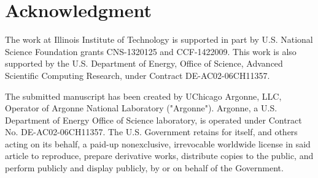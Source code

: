 \documentclass[conference]{IEEEtran}
\begin{document}



%






\section*{Acknowledgment}
\label{sec: ack}
The work at Illinois Institute of Technology is supported in part by U.S. National Science Foundation grants CNS-1320125 and CCF-1422009. This work is also supported by the U.S. Department of Energy, Office of Science, Advanced Scientific Computing Research, under Contract DE-AC02-06CH11357.




\vspace{5\baselineskip}

\begin{framed}
The submitted manuscript has been created by UChicago Argonne, LLC, Operator of Argonne National Laboratory ("Argonne").  Argonne, a U.S. Department of Energy Office of Science laboratory, is operated under Contract No. DE-AC02-06CH11357.  The U.S. Government retains for itself, and others acting on its behalf, a paid-up nonexclusive, irrevocable worldwide license in said article to reproduce, prepare derivative works, distribute copies to the public, and perform publicly and display publicly, by or on behalf of the Government.
\end{framed}
\end{document}
